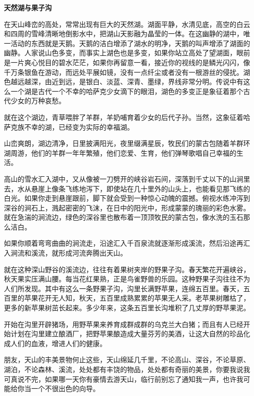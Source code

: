\documentclass[12pt,UTF-8,openany]{ctexbook}
\begin{document}
\begin{normalsize}
    \begin{center}
    
    \begin{large}\textbf{天然湖与果子沟}\end{large}
    
    \end{center}
    
    在天山峰峦的高处，常常出现有巨大的天然湖。湖面平静，水清见底，高空的白云和四周的雪峰清晰地倒影水中，把湖山天影融为晶莹的一体。在这幽静的湖中，唯一活动的东西就是天鹅。天鹅的洁白增添了湖水的明净，天鹅的叫声增添了湖面的幽静。人家说山色多变，而事实上湖色也是多变，如果你站立高处了望湖面，眼前是一片爽心悦目的碧水茫茫，如果你再留意一看，接近你的视线的是鳞光闪闪，像千万条银鱼在游动，而远处平展如镜，没有一点纤尘或者没有一根游丝的侵扰。湖色越远越深，由近到远，是银白、淡蓝、深青、墨绿，界线非常分明。传说中有这么一个湖是古代一个不幸的哈萨克少女滴下的眼泪，湖色的多变正是象征着那个古代少女的万种哀愁。
    
    就在这个湖边，青草喂胖了羊群，羊奶哺育着少女的后代子孙。当然，这象征着哈萨克族不幸的湖，已经变为实际的幸福湖。
    
    山峦爽朗，湖边清净，日里披满阳光，夜里缀满星辰，牧民们的蒙古包随着羊群环湖周游，他们的羊群一年年繁殖，他们恋爱、生育，他们弹琴歌唱自己幸福的生活。
    
    高山的雪水汇入湖中，又从像被一刀劈开的峡谷岩石间，深落到千丈以下的山涧里去，水从悬崖上像条飞练地泻下，即使站在几十里外的山头上，也能看见那飞练的白光。如果你走到悬崖跟前，脚下就会受到一种惊心动魄的震撼。俯视水练冲泻到深谷的涧石上，溅起密密的飞沫，在日中的阳光中，形成蒙蒙的瑰丽的彩色水雾。就在急湍的涧流边，绿色的深谷里也散布着一顶顶牧民的蒙古包，像水洗的玉石那么洁白。
    
    如果你顺着弯弯曲曲的涧流走，沿途汇入千百泉流就逐渐形成溪流，然后沿途再汇入涧流和溪流，就形成河流奔腾出天山。
    
    就在这种深山野谷的溪流边，往往有着果树夹岸的野果子沟。春天繁花开遍峡谷，秋天果实压满山腰。每当花红果熟，正是鸟雀野兽的乐园。这种野果子沟往往不为人们所发现。其中有这么一条野果子沟，沟里长满野苹果，连绵五百里。春天，五百里的苹果花开无人知，秋天，五百里成熟累累的苹果无人采。老苹果树雕枯了，更多的新苹果树茁长起来。多少年来，这条五百里长沟堆积了几丈厚的野苹果泥。
    
    开始在沟里开辟猪场，用野苹果来养育成群成群的乌克兰大白猪；而且有人已经开始计划在沟里建立酿酒厂，把野苹果酿造成大量芬芳的美酒，让这大自然的珍品化成人们的血液，增进人们的健康。
    
    朋友，天山的丰美景物何止这些，天山绵延几千里，不论高山、深谷，不论草原、湖泊，不论森林、溪流，处处都有丰饶的物品，处处都有奇丽的美景，你要我说我可真说不完，如果哪一天你有豪情去游天山，临行前别忘了通知我一声，也许我可能给你当一个不很出色的向导。
    
\end{normalsize}
\end{document}
